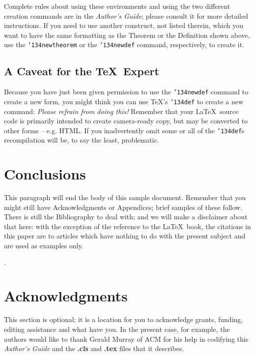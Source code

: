 \documentclass{sig-alternate-br}
\begin{document}
Complete rules about using these environments and using the two
different creation commands are in the \textit{Author's Guide};
please consult it for more detailed instructions.  If you need to
use another construct, not listed therein, which you want to have
the same formatting as the Theorem or the
Definition\cite{salas:calculus} shown above, use the
\texttt{{\char'134}newtheorem} or the \texttt{{\char'134}newdef}
command, respectively, to create it.

\subsection*{A {\secit Caveat} for the \TeX\ Expert}
Because you have just been given permission to use the
\texttt{{\char'134}newdef} command to create a new form, you might
think you can use \TeX's \texttt{{\char'134}def} to create a new
command: \textit{Please refrain from doing this!} Remember that
your \LaTeX\ source code is primarily intended to create
camera-ready copy, but may be converted to other forms -- e.g.
HTML. If you inadvertently omit some or all of the
\texttt{{\char'134}def}s recompilation will be, to say the least,
problematic.

\section{Conclusions}
This paragraph will end the body of this sample document. Remember
that you might still have Acknowledgments or Appendices; brief
samples of these follow.  There is still the Bibliography to deal
with; and we will make a disclaimer about that here: with the
exception of the reference to the \LaTeX\ book, the citations in
this paper are to articles which have nothing to do with the
present subject and are used as examples only.


\vspace{70 mm}
.
\vspace{10 mm}

\section{Acknowledgments}
This section is optional; it is a location for you to acknowledge
grants, funding, editing assistance and what have you.  In the
present case, for example, the authors would like to thank Gerald
Murray of ACM for his help in codifying this \textit{Author's
Guide} and the \textbf{.cls} and \textbf{.tex} files that it
describes.
\end{document}
